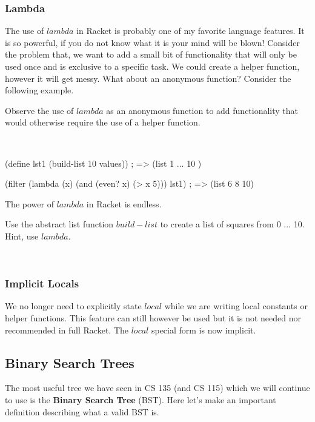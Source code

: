 \documentclass[11pt, twoside, exarticle]{article}
\newcommand{\exbox}[2] {
	\setlength{\fboxsep}{8pt}
	\marginpar {
		\vspace{0.9em}
		\footnotesize{\textbf{\color{darkpurple}EXAMPLE #1}}
	}
	\colorbox{lightpurple}{
		\begin{varwidth}{\dimexpr\linewidth-2\fboxsep}
		#2
		\end{varwidth}
	}
	~\\
}
\newcommand{\exerbox}[1] {
	\setlength{\fboxsep}{8pt}
	\marginpar {
		\vspace{0.9em}
		\footnotesize{\textbf{\color{darkred}EXERCISE}}
	}
	\colorbox{lightred}{
		\begin{varwidth}{\dimexpr\linewidth-2\fboxsep}
		#1
		\end{varwidth}
	}
	~\\
}
\begin{document}
\subsubsection*{Lambda}

The use of $lambda$ in Racket is probably one of my favorite language features. It is so powerful, if you do not know what it is your mind will be blown! Consider the problem that, we want to add a small bit of functionality that will only be used once and is exclusive to a specific task. We could create a helper function, however it will get messy. What about an anonymous function? Consider the following example.\\

\exbox{9}{Observe the use of $lambda$ as an anonymous function to add functionality that would otherwise require the use of a helper function.}

\begin{code}[Lisp]
(define lst1 (build-list 10 values)) ; => (list 1 ... 10 )

(filter (lambda (x) (and (even? x) (> x 5))) lst1) ; => (list 6 8 10)
\end{code}

The power of $lambda$ in Racket is endless.\\

\exerbox{Use the abstract list function $build-list$ to create a list of squares from 0 ... 10. Hint, use $lambda$.}

\subsubsection*{Implicit Locals}

We no longer need to explicitly state $local$ while we are writing local constants or helper functions. This feature can still however be used but it is not needed nor recommended in full Racket. The $local$ special form is now implicit.

\clearpage
\subsection{Binary Search Trees}

The most useful tree we have seen in CS 135 (and CS 115) which we will continue to use is the \textbf{Binary Search Tree} (BST). Here let's make an important definition describing what a valid BST is.\\
\end{document}
